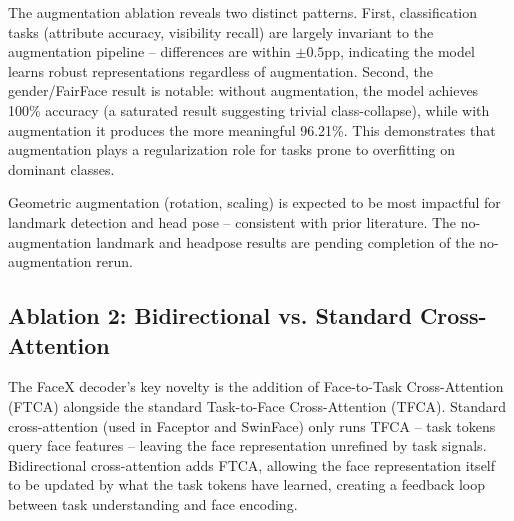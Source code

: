 \documentclass[11pt]{article}
\begin{document}
The augmentation ablation reveals two distinct patterns. First, classification tasks (attribute accuracy, visibility recall) are largely invariant to the augmentation pipeline -- differences are within $\pm0.5$pp, indicating the model learns robust representations regardless of augmentation. Second, the gender/FairFace result is notable: without augmentation, the model achieves 100\% accuracy (a saturated result suggesting trivial class-collapse), while with augmentation it produces the more meaningful 96.21\%. This demonstrates that augmentation plays a regularization role for tasks prone to overfitting on dominant classes.

Geometric augmentation (rotation, scaling) is expected to be most impactful for landmark detection and head pose -- consistent with prior literature. The no-augmentation landmark and headpose results are pending completion of the no-augmentation rerun.



\subsection{Ablation 2: Bidirectional vs. Standard Cross-Attention}

The FaceX decoder's key novelty is the addition of Face-to-Task Cross-Attention (FTCA) alongside the standard Task-to-Face Cross-Attention (TFCA). Standard cross-attention (used in Faceptor and SwinFace) only runs TFCA -- task tokens query face features -- leaving the face representation unrefined by task signals. Bidirectional cross-attention adds FTCA, allowing the face representation itself to be updated by what the task tokens have learned, creating a feedback loop between task understanding and face encoding.
\end{document}
